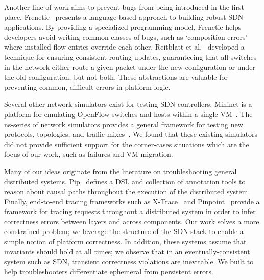 {{Another line of work aims to prevent bugs from being introduced in the first
place. Frenetic~\cite{frenetic} presents a language-based approach to building
robust SDN applications. By providing a specialized programming model,
 Frenetic helps developers avoid writing common classes of
bugs, such as `composition errors' where installed flow entries override each other.
Reitblatt et al.~\cite{consistentupdates} developed a technique for ensuring
consistent routing updates, guaranteeing that all switches in the network either route
a given packet under the new configuration or under the old configuration,
but not both. These abstractions are valuable for preventing common, difficult errors
in platform logic.

Several other network simulators exist for testing SDN controllers. Mininet is a
platform for emulating OpenFlow switches and hosts within a single
 VM~\cite{Lantz:2010:NLR:1868447.1868466}. The ns-series of network simulators
provides a general framework for testing new protocols, topologies,
and traffic mixes~\cite{ns3}. We found that these existing simulators did
not provide sufficient support for the corner-cases situations which are the
focus of our work, such as failures and VM migration.

Many of our ideas originate from the literature on troubleshooting general
distributed systems. Pip~\cite{pip} defines a DSL and collection of annotation tools to
reason about causal paths throughout the execution of the
distributed system. Finally, end-to-end tracing
frameworks such as X-Trace~\cite{Fonseca:2007:XPN:1973430.1973450} and
Pinpoint~\cite{Chen02pinpoint:problem} provide a framework for tracing requests throughout
a distributed system in order to infer correctness errors between layers and
across components. Our work solves a more constrained problem; we leverage
the structure of the SDN stack to enable a simple notion of platform
correctness. In addition, these systems assume that invariants should hold at
all times; we observe that in an eventually-consistent system such as SDN,
transient correctness violations are inevitable. We built \simulator{} to help troubleshooters
differentiate ephemeral from persistent errors.

}
}
